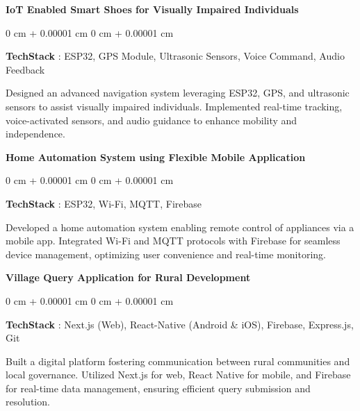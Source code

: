 \documentclass[10pt, letterpaper]{article}
\newenvironment{onecolentry}{
    \begin{adjustwidth}{
        0 cm + 0.00001 cm
    }{
        0 cm + 0.00001 cm
    }
}{
    \end{adjustwidth}
} %
\begin{document}
  \begin{samepage}
                \textbf{IoT Enabled Smart Shoes for Visually Impaired Individuals    }
            \vspace{0.05cm}
            
            \begin{onecolentry}
               \textbf{TechStack} :  ESP32, GPS Module, Ultrasonic Sensors, Voice Command, Audio Feedback 

                \vspace{0.05 cm}
                Designed an advanced navigation system leveraging ESP32, GPS, and ultrasonic sensors to assist visually impaired individuals. Implemented real-time tracking, voice-activated sensors, and audio guidance to enhance mobility and independence.  
        \end{onecolentry}
        \end{samepage}
        \vspace{0.3cm}
        \begin{samepage}
                \textbf{Home Automation System using Flexible Mobile Application  }
            \vspace{0.05 cm}
            
            \begin{onecolentry}
               \textbf{TechStack} :  ESP32, Wi-Fi, MQTT, Firebase  

                \vspace{0.05 cm}
                Developed a home automation system enabling remote control of appliances via a mobile app. Integrated Wi-Fi and MQTT protocols with Firebase for seamless device management, optimizing user convenience and real-time monitoring. 
        \end{onecolentry}
        \end{samepage}
         \vspace{0.3 cm}
         \begin{samepage}
                \textbf{Village Query Application for Rural Development    }
            \vspace{0.05 cm}
            
            \begin{onecolentry}
               \textbf{TechStack} :  Next.js (Web), React-Native (Android \& iOS), Firebase, Express.js, Git  

                \vspace{0.05 cm}
                Built a digital platform fostering communication between rural communities and local governance. Utilized Next.js for web, React Native for mobile, and Firebase for real-time data management, ensuring efficient query submission and resolution.  
        \end{onecolentry}
        \end{samepage}
\end{document}
